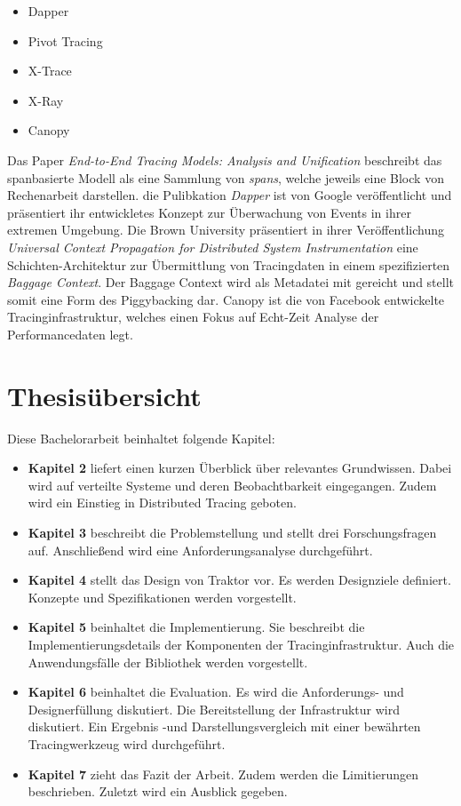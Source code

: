 \begin{itemize}
	\item Dapper 
	\item Pivot Tracing 
	\item X-Trace 
	\item X-Ray 
	\item Canopy 
\end{itemize}
Das Paper \emph{End-to-End Tracing Models: Analysis and Unification} beschreibt das spanbasierte Modell als eine Sammlung von \emph{spans}, welche jeweils eine Block von Rechenarbeit darstellen. die Pulibkation \emph{Dapper} ist von Google veröffentlicht und präsentiert ihr entwickletes Konzept zur Überwachung von Events in ihrer extremen Umgebung. Die Brown University präsentiert in ihrer Veröffentlichung \emph{Universal Context Propagation for Distributed System Instrumentation} eine Schichten-Architektur zur Übermittlung von Tracingdaten in einem spezifizierten \emph{Baggage Context}. Der Baggage Context wird als Metadatei mit gereicht und stellt somit eine Form des Piggybacking dar. Canopy ist die von Facebook entwickelte Tracinginfrastruktur, welches einen Fokus auf Echt-Zeit Analyse der Performancedaten legt.

\section{Thesisübersicht}
\label{section:Thesisübersicht}

Diese Bachelorarbeit beinhaltet folgende Kapitel:

\begin{itemize}
	\item \textbf{Kapitel 2} liefert einen kurzen Überblick über relevantes Grundwissen. Dabei wird auf verteilte Systeme und deren Beobachtbarkeit eingegangen. Zudem wird ein Einstieg in Distributed Tracing geboten.
	\item \textbf{Kapitel 3} beschreibt die Problemstellung und stellt drei Forschungsfragen auf. Anschließend wird eine Anforderungsanalyse durchgeführt.
	\item \textbf{Kapitel 4} stellt das Design von Traktor vor. Es werden Designziele definiert. Konzepte und Spezifikationen werden vorgestellt. 
	\item \textbf{Kapitel 5} beinhaltet die Implementierung. Sie beschreibt die Implementierungsdetails der Komponenten der Tracinginfrastruktur. Auch die Anwendungsfälle der Bibliothek werden vorgestellt.
	\item \textbf{Kapitel 6} beinhaltet die Evaluation. Es wird die Anforderungs- und Designerfüllung diskutiert. Die Bereitstellung der Infrastruktur wird diskutiert. Ein Ergebnis -und Darstellungsvergleich mit einer bewährten Tracingwerkzeug wird durchgeführt.
	\item \textbf{Kapitel 7} zieht das Fazit der Arbeit. Zudem werden die Limitierungen beschrieben. Zuletzt wird ein  Ausblick gegeben.
\end{itemize}
